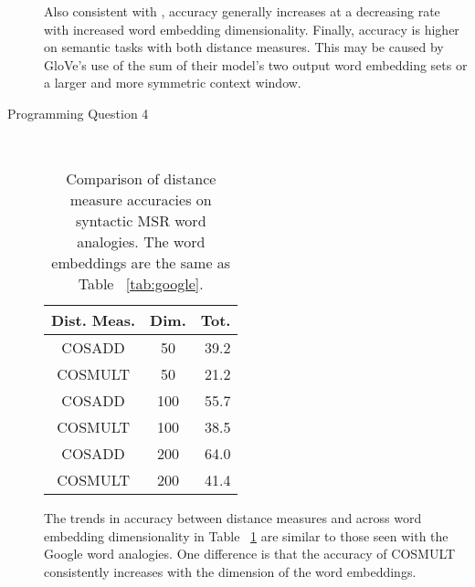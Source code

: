 \documentclass{article}
\newcommand*{\0}{\Vec{0}}
\begin{document}
\begin{description}
		Also consistent with \cite{glove}, accuracy generally increases at a decreasing rate with increased word embedding dimensionality.
		Finally, accuracy is higher on semantic tasks with both distance measures.
		This may be caused by GloVe's use of the sum of their model's two output word embedding sets or a larger and more symmetric context window.\cite{glove} 
	\item[Programming Question 4] \hfill \\
		\begin{table}[H]
			\centering
			\begin{tabular}{|cc|r|}
				\hline
				Dist. Meas. & Dim. & Tot. \\
				\hline
				COSADD & 50 & 39.2 \\
				COSMULT & 50 & 21.2 \\
				\hline
				COSADD & 100 & 55.7 \\
				COSMULT & 100 & 38.5 \\
				\hline
				COSADD & 200 & 64.0 \\
				COSMULT & 200 & 41.4 \\
				\hline
			\end{tabular}
			\caption{Comparison of distance measure accuracies on syntactic MSR word analogies. The word embeddings are the same as Table ~\ref{tab:google}.}
			\label{tab:msr}
		\end{table}
		The trends in accuracy between distance measures and across word embedding dimensionality in Table ~\ref{tab:msr} are similar to those seen with the Google word analogies.
		One difference is that the accuracy of COSMULT consistently increases with the dimension of the word embeddings.
\end{description}



\end{document}
